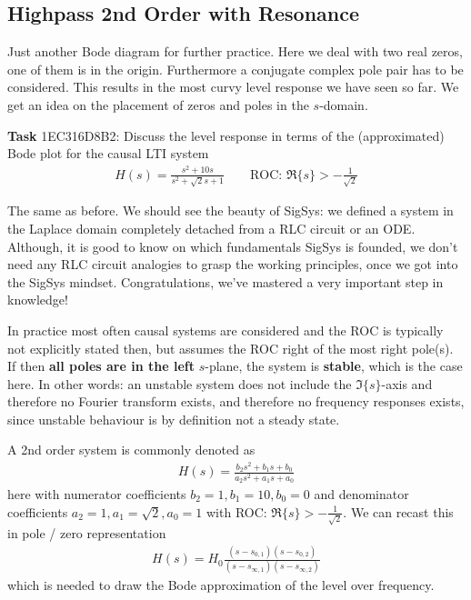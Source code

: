 \subsection{Highpass 2nd Order with Resonance}
\label{sec:1EC316D8B2}
\begin{Ziel}
Just another Bode diagram for further practice. Here we deal with two real zeros,
one of them is in the origin. Furthermore a conjugate complex pole pair has to be
considered. This results in the most curvy level response we have seen so far.
We get an idea on the placement of zeros and poles in the $s$-domain.
\end{Ziel}
\textbf{Task} {\tiny 1EC316D8B2}:  Discuss the level response in terms
of the (approximated) Bode plot for the causal LTI system
\begin{align}
H(s) = \frac{s^2+10 s}{s^2+\sqrt{2} s +1}\qquad\text{ROC: }
\Re\{s\}>-\frac{1}{\sqrt{2}}
\end{align}
\begin{Werkzeug}
The same as before. We should see the beauty of SigSys: we defined a system
in the Laplace domain completely detached from a RLC circuit or an ODE.
Although, it is good to know on which fundamentals SigSys is founded, we don't need
any RLC circuit analogies to grasp the working principles, once we got into the
SigSys mindset. Congratulations, we've mastered a very important step in knowledge!
\end{Werkzeug}
\begin{Ansatz}
In practice most often causal systems are considered and the ROC is typically
not explicitly stated then, but assumes the ROC right of the most right pole(s).
If then \textbf{all poles are in the left} $s$-plane, the system is \textbf{stable},
which is the case here.
In other words: an unstable system does not include the $\Im\{s\}$-axis and therefore
no Fourier transform exists, and therefore no frequency responses exists, since unstable
behaviour is by definition not a steady state.

A 2nd order system is commonly denoted as
\begin{align}
H(s) = \frac{b_2 s^2+b_1 s + b_0}{a_2 s^2+a_1 s +a_0}
\end{align}
here with numerator coefficients $b_2 = 1, b_1 = 10, b_0=0$ and denominator
coefficients
$a_2 = 1, a_1 = \sqrt{2}, a_0=1$ with ROC: $\Re\{s\}>-\frac{1}{\sqrt{2}}$.
We can recast this in pole / zero representation
\begin{align}
H(s) = H_0\frac{(s-s_{0,1}) (s-s_{0,2})}{(s-s_{\infty,1})(s-s_{\infty,2})}
\end{align}
which is needed to draw the Bode approximation of the level over frequency.
\end{Ansatz}
